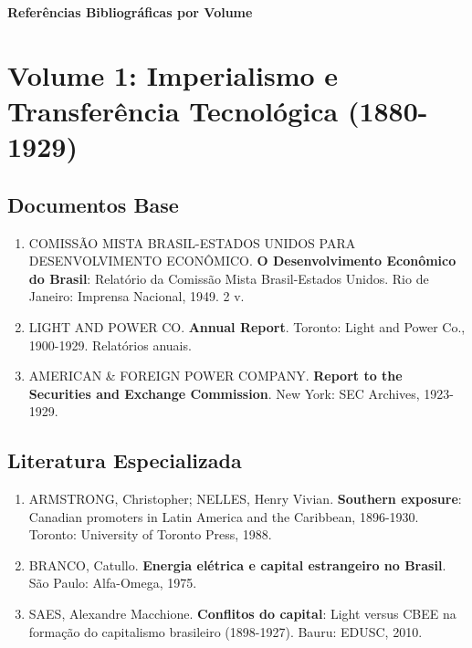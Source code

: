 \documentclass[12pt,a4paper]{report}
\begin{document}
\begin{center}
{\Large\textbf{Referências Bibliográficas por Volume}}
\vspace{1cm}
\end{center}

\chapter*{Volume 1: Imperialismo e Transferência Tecnológica (1880-1929)}

\section*{Documentos Base}
\begin{enumerate}[leftmargin=*]
    \item COMISSÃO MISTA BRASIL-ESTADOS UNIDOS PARA DESENVOLVIMENTO ECONÔMICO. \textbf{O Desenvolvimento Econômico do Brasil}: Relatório da Comissão Mista Brasil-Estados Unidos. Rio de Janeiro: Imprensa Nacional, 1949. 2 v.
    
    \item LIGHT AND POWER CO. \textbf{Annual Report}. Toronto: Light and Power Co., 1900-1929. Relatórios anuais.
    
    \item AMERICAN \& FOREIGN POWER COMPANY. \textbf{Report to the Securities and Exchange Commission}. New York: SEC Archives, 1923-1929.
\end{enumerate}

\section*{Literatura Especializada}
\begin{enumerate}[leftmargin=*]
    \item ARMSTRONG, Christopher; NELLES, Henry Vivian. \textbf{Southern exposure}: Canadian promoters in Latin America and the Caribbean, 1896-1930. Toronto: University of Toronto Press, 1988.
    
    \item BRANCO, Catullo. \textbf{Energia elétrica e capital estrangeiro no Brasil}. São Paulo: Alfa-Omega, 1975.
    
    \item SAES, Alexandre Macchione. \textbf{Conflitos do capital}: Light versus CBEE na formação do capitalismo brasileiro (1898-1927). Bauru: EDUSC, 2010.
\end{enumerate}
\end{document}
